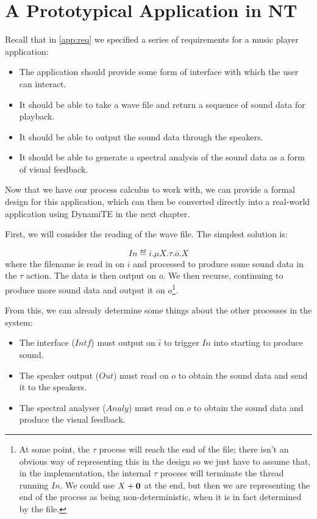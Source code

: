 \section{A Prototypical Application in NT}
\label{app:nt}

Recall that in \ref{app:req} we specified a series of requirements for a music player application:

\begin{itemize}
\item The application should provide some form of interface with which
  the user can interact.
\item It should be able to take a wave file and return a sequence of
  sound data for playback.
\item It should be able to output the sound data through the speakers.
\item It should be able to generate a spectral analysis of the sound
  data as a form of visual feedback.
\end{itemize}

Now that we have our process calculus to work with, we can provide a formal design for this application,
which can then be converted directly into a real-world application using DynamiTE in the next chapter.

First, we will consider the reading of the wave file.  The simplest solution is:

\begin{equation}
  In \eqdef i.\mu X.\tau.\overline{o}.X
\end{equation}
\noindent where the filename is read in on $i$ and processed to
produce some sound data in the $\tau$ action.  The data is then output
on $o$.  We then recurse, continuing to produce more sound data and
output it on $o$\footnote{At some point, the $\tau$ process will reach
  the end of the file; there isn't an obvious way of representing this
  in the design so we just have to assume that, in the implementation,
  the internal $\tau$ process will terminate the thread running
  $In$.  We could use $X + \textbf{0}$ at the end, but then we are
  representing the end of the process as being non-deterministic, when
  it is in fact determined by the file.}.

From this, we can already determine some things about the other processes in the system:

\begin{itemize}
\item The interface ($Intf$) must output on $\overline{i}$ to trigger
  $In$ into starting to produce sound.
\item The speaker output ($Out$) must read on $o$ to obtain the sound
  data and send it to the speakers.
\item The spectral analyser ($Analy$) must read on $o$ to obtain the
  sound data and produce the visual feedback.
\end{itemize}

